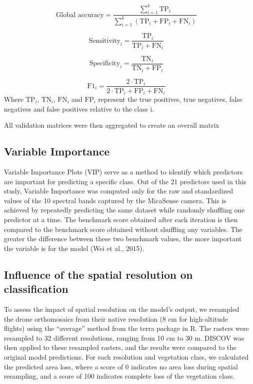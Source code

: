 \documentclass[
  letterpaper,
  11pt,
  english,
  singlespacing,
  headsepline]{MastersDoctoralThesis}
\begin{document}
\begin{spacing}{1.5}
\[
\text{Global accuracy} = \frac{\sum_{i=1}^{k} \text{TP}_i}{\sum_{i=1}^{k} \left(\text{TP}_i + \text{FP}_i + \text{FN}_i \right)}
\]

\[
\text{Sensitivity}_i = \frac{\text{TP}_i}{\text{TP}_i + \text{FN}_i}
\]

\[
\text{Specificity}_i = \frac{\text{TN}_i}{\text{TN}_i + \text{FP}_i}
\]

\[
\text{F1}_i = \frac{2 \cdot \text{TP}_i}{2 \cdot \text{TP}_i + \text{FP}_i + \text{FN}_i}
\] Where \(\text{TP}_i\), \(\text{TN}_i\), \(\text{FN}_i\) and
\(\text{FP}_i\) represent the true positives, true negatives, false
negatives and false positives relative to the class i.

All validation matrices were then aggregated to create an overall matrix

\subsection{Variable Importance}\label{variable-importance}

Variable Importance Plots (VIP) serve as a method to identify which
predictors are important for predicting a specific class. Out of the 21
predictors used in this study, Variable Importance was computed only for
the raw and standardized values of the 10 spectral bands captured by the
MicaSense camera. This is achieved by repeatedly predicting the same
dataset while randomly shuffling one predictor at a time. The benchmark
score obtained after each iteration is then compared to the benchmark
score obtained without shuffling any variables. The greater the
difference between these two benchmark values, the more important the
variable is for the model (Wei et al., 2015).

\subsection{Influence of the spatial resolution on
classification}\label{influence-of-the-spatial-resolution-on-classification}

To assess the impact of spatial resolution on the model's output, we
resampled the drone orthomosaics from their native resolution (8 cm for
high-altitude flights) using the ``average'' method from the terra
package in R. The rasters were resampled to 32 different resolutions,
ranging from 10 cm to 30 m. DISCOV was then applied to these resampled
rasters, and the results were compared to the original model
predictions. For each resolution and vegetation class, we calculated the
predicted area loss, where a score of 0 indicates no area loss during
spatial resampling, and a score of 100 indicates complete loss of the
vegetation class.


\end{spacing}
\end{document}
